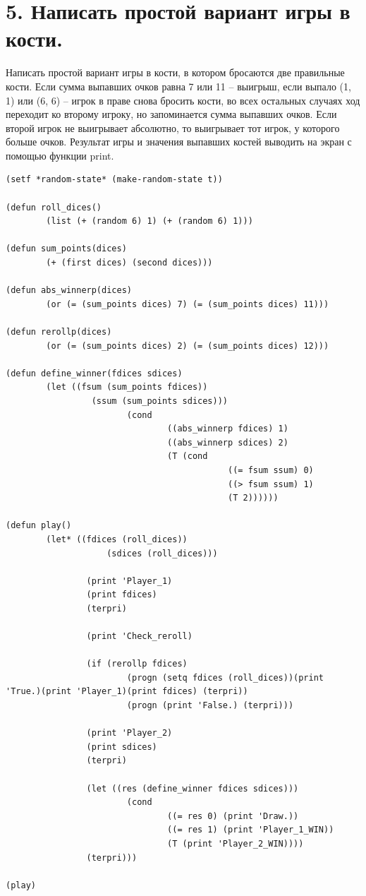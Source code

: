 \documentclass[12pt]{report}
\begin{document}
\section*{5. Написать простой вариант игры в кости.}

Написать простой вариант игры в кости, в котором бросаются две правильные кости. Если сумма выпавших очков равна 7 или 11 -- выигрыш, если выпало (1, 1) или (6, 6) -- игрок в праве снова бросить кости, во всех остальных случаях ход переходит ко второму игроку, но запоминается сумма выпавших очков. Если второй игрок не выигрывает абсолютно, то выигрывает тот игрок, у которого больше очков. Результат игры и значения выпавших костей выводить на экран с помощью функции print.

\begin{lstlisting}
(setf *random-state* (make-random-state t))

(defun roll_dices()
		(list (+ (random 6) 1) (+ (random 6) 1)))

(defun sum_points(dices)
		(+ (first dices) (second dices)))

(defun abs_winnerp(dices)
		(or (= (sum_points dices) 7) (= (sum_points dices) 11)))

(defun rerollp(dices)
		(or (= (sum_points dices) 2) (= (sum_points dices) 12)))

(defun define_winner(fdices sdices)
		(let ((fsum (sum_points fdices))
			     (ssum (sum_points sdices)))
						(cond 
								((abs_winnerp fdices) 1)
								((abs_winnerp sdices) 2)
								(T (cond 
											((= fsum ssum) 0)
											((> fsum ssum) 1)
											(T 2))))))

(defun play()
		(let* ((fdices (roll_dices))
					(sdices (roll_dices)))
				
				(print 'Player_1) 
				(print fdices)
				(terpri)
				
				(print 'Check_reroll)
				
				(if (rerollp fdices) 
						(progn (setq fdices (roll_dices))(print 'True.)(print 'Player_1)(print fdices) (terpri)) 
						(progn (print 'False.) (terpri)))
				
				(print 'Player_2) 
				(print sdices)
				(terpri)
				
				(let ((res (define_winner fdices sdices)))
						(cond 
								((= res 0) (print 'Draw.))
								((= res 1) (print 'Player_1_WIN))
								(T (print 'Player_2_WIN))))
				(terpri)))

(play)
\end{lstlisting}
\end{document}

